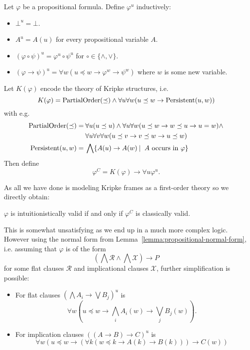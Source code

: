 \documentclass[runningheads]{llncs}
\begin{document}
\begin{definition}
	Let $\varphi$ be a propositional formula. Define $\varphi^{u}$ inductively:
	\begin{itemize}
		\item $\bot^u = \bot$.
		\item $A^{u} = A(u)$ for every propositional variable $A$.
		\item $(\varphi\circ\psi)^u = \varphi^u\circ\psi^u$ for $\circ\in\{\wedge, \vee\}$.
		\item $(\varphi\to \psi)^u = \forall w(u\preceq w\to\varphi^{w}\to\psi^{w})$ where $w$ is some new variable.
	\end{itemize}
	Let $K(\varphi)$ encode the theory of Kripke structures, i.e.
	$$K(\varphi) = \text{\normalfont PartialOrder}(\preceq)\wedge\forall u\forall w(u\preceq w\to \text{\normalfont Persistent}(u, w))$$
	with e.g.
	\begin{align*}
		\text{\normalfont PartialOrder}(\preceq) =&\:\forall u(u\preceq u)\wedge\forall u\forall w(u\preceq w\to w\preceq u\to u = w)\wedge\\&\:\forall u\forall v\forall w(u\preceq v\to v\preceq w\to u\preceq w)\\
		\text{\normalfont Persistent}(u, w)=&\:\bigwedge \{A(u)\to A(w)\:|\: \text{ $A$ occurs in $\varphi$}\}
	\end{align*}
	Then define
	$$\varphi^{C} = K(\varphi)\to \forall u\varphi^{u}.$$
\end{definition}

\noindent As all we have done is modeling Kripke frames as a first-order theory so we directly obtain:

\begin{lemma}
	$\varphi$ is intuitionistically valid if and only if $\varphi^C$ is classically valid.
\end{lemma}

This is somewhat unsatisfying as we end up in a much more complex logic. However using the normal form from Lemma~\ref{lemma:propositional-normal-form}, i.e. assuming that $\varphi$ is of the form $$\left(\bigwedge\mathcal R\wedge\bigwedge\mathcal X\right)\to P$$ for some flat clauses $\mathcal R$ and implicational clauses $\mathcal X$, further simplification is possible:
\begin{itemize}
	\item For flat clauses $(\bigwedge A_i\to\bigvee B_j)^u$ is
	$$\forall w\left(u\preceq w\to\bigwedge_i A_i(w)\to\bigvee_jB_j(w)\right).$$
	\item For implication clauses $((A\to B)\to C)^u$ is
	$$\forall w(u\preceq w\to(\forall k(w\preceq k\to A(k)\to B(k)))\to C(w))$$
\end{itemize}
\end{document}
